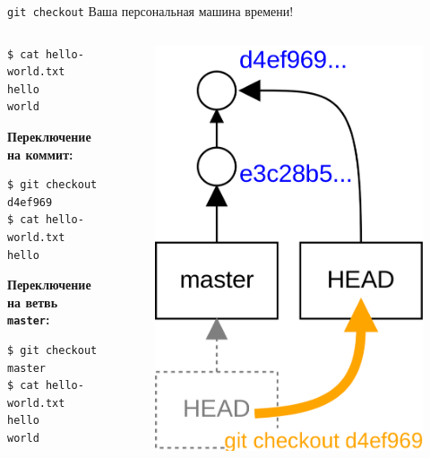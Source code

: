 \documentclass[presentation]{beamer}
\begin{document}
\begin{frame}[fragile]{\texttt{git checkout}}
  \centering
  \LARGE Ваша персональная машина времени!
  \normalsize
  \begin{columns}
    \begin{column}{0.6\textwidth}
\begin{verbatim}
$ cat hello-world.txt
hello
world
\end{verbatim}

  \textbf{Переключение на коммит:}
\begin{verbatim}
$ git checkout d4ef969
$ cat hello-world.txt
hello
\end{verbatim}

  \textbf{Переключение на ветвь \texttt{master}:}
\begin{verbatim}
$ git checkout master
$ cat hello-world.txt
hello
world
\end{verbatim}
    \end{column}
    \begin{column}{0.4\textwidth}
      \begin{figure}[htb]
        \includegraphics[width=1\textwidth]{git-operation-checkout}
      \end{figure}
    \end{column}
  \end{columns}
  \bigskip
\end{frame}
\end{document}
